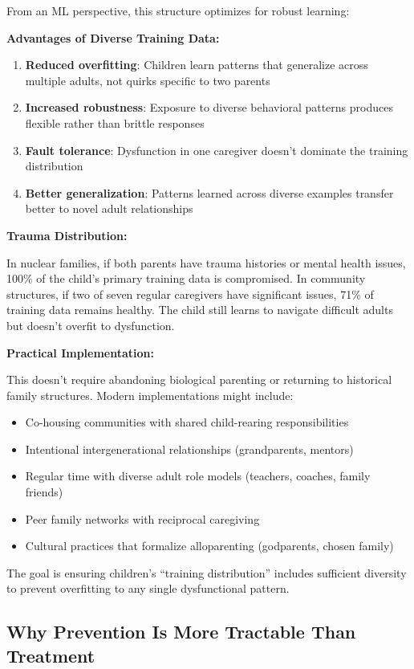 \documentclass{article}
\begin{document}
From an ML perspective, this structure optimizes for robust learning:

\textbf{Advantages of Diverse Training Data:}
\begin{enumerate}
\item \textbf{Reduced overfitting}: Children learn patterns that generalize across multiple adults, not quirks specific to two parents
\item \textbf{Increased robustness}: Exposure to diverse behavioral patterns produces flexible rather than brittle responses
\item \textbf{Fault tolerance}: Dysfunction in one caregiver doesn't dominate the training distribution
\item \textbf{Better generalization}: Patterns learned across diverse examples transfer better to novel adult relationships
\end{enumerate}

\textbf{Trauma Distribution:}

In nuclear families, if both parents have trauma histories or mental health issues, 100\% of the child's primary training data is compromised. In community structures, if two of seven regular caregivers have significant issues, 71\% of training data remains healthy. The child still learns to navigate difficult adults but doesn't overfit to dysfunction.

\textbf{Practical Implementation:}

This doesn't require abandoning biological parenting or returning to historical family structures. Modern implementations might include:

\begin{itemize}
\item Co-housing communities with shared child-rearing responsibilities
\item Intentional intergenerational relationships (grandparents, mentors)
\item Regular time with diverse adult role models (teachers, coaches, family friends)
\item Peer family networks with reciprocal caregiving
\item Cultural practices that formalize alloparenting (godparents, chosen family)
\end{itemize}

The goal is ensuring children's ``training distribution'' includes sufficient diversity to prevent overfitting to any single dysfunctional pattern.

\subsection{Why Prevention Is More Tractable Than Treatment}
\end{document}
